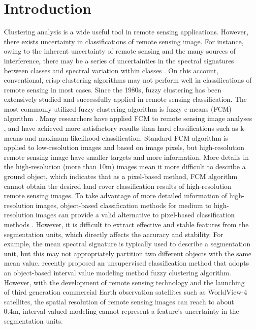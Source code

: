 \documentclass[preprint,12pt,authoryear]{elsarticle}
\begin{document}
\linenumbers

\section{Introduction}
\label{sec:1}
Clustering analysis is a wide useful tool in remote sensing applications. However, there exists uncertainty in classifications of remote sensing image. For instance, owing to the inherent uncertainty of remote sensing and the many sources of interference, there may be a series of uncertainties in the spectral signatures between classes and spectral variation within classes \citep{Cheng2004}. On this account, conventional, crisp clustering algorithms may not perform well in classifications of remote sensing in most cases. Since the 1980s, fuzzy clustering has been extensively studied and successfully applied in  remote sensing classification. The most commonly utilized fuzzy clustering algorithm is fuzzy c-means (FCM) algorithm \citep{bezdek1984fcm}. Many researchers have applied FCM to remote sensing image analyses \citep{ibrahim2005estimating, schowengerdt2006remote, ghosh2011fuzzy} , and have achieved more satisfactory results than hard classifications such as k-means and maximum likelihood classification. Standard FCM algorithm is applied to low-resolution images and based on image pixels, but high-resolution remote sensing image have smaller targets and more information. More details in the high-resolution (more than 10m) images mean it more difficult to describe a ground object, which indicates that as a  pixel-based method, FCM algorithm cannot obtain the desired land cover classification results of high-resolution remote sensing images. To take advantage of more detailed information of high-resolution images, object-based classification methods for medium to high-resolution images can provide a valid alternative to pixel-based classification methods \citep{geneletti2003method, guo2007object, tenenbaum2011comparison, yu2012method}. However, it is difficult to extract effective and stable features from the segmentation units, which directly affects the accuracy and stability. For example, the mean spectral signature is typically used to describe a segmentation unit, but this may not appropriately partition two different objects with the same mean value. \cite{he2016remote} recently proposed an unsupervised classification method that adopts an object-based  interval value modeling method fuzzy clustering algorithm. However, with the development of remote sensing technology and the launching of third generation commercial Earth observation satellites such as WorldView-4 satellites, the spatial resolution of remote sensing images can reach to about 0.4m, interval-valued modeling cannot represent a feature's uncertainty in the segmentation units.
\end{document}
